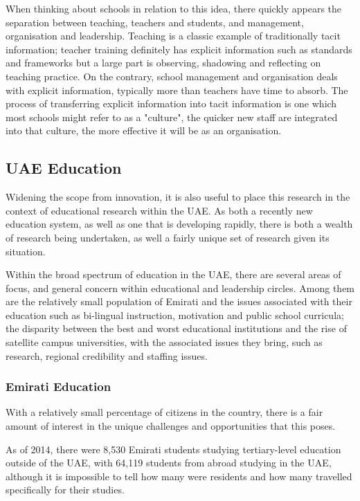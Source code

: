 When thinking about schools in relation to this idea, there quickly appears the separation between teaching, teachers and students, and management, organisation and leadership. Teaching is a classic example of traditionally tacit information; teacher training definitely has explicit information such as standards and frameworks but a large part is observing, shadowing and reflecting on teaching practice. On the contrary, school management and organisation deals with explicit information, typically more than teachers have time to absorb. The process of transferring explicit information into tacit information is one which most schools might refer to as a "culture", the quicker new staff are integrated into that culture, the more effective it will be as an organisation.

\subsection{UAE Education}
Widening the scope from innovation, it is also useful to place this research in the context of educational research within the UAE. As both a recently new education system, as well as one that is developing rapidly, there is both a wealth of research being undertaken, as well a fairly unique set of research given its situation.

Within the broad spectrum of education in the UAE, there are several areas of focus, and general concern within educational and leadership circles. Among them are the relatively small population of Emirati and the issues associated with their education such as bi-lingual instruction, motivation and public school curricula; the disparity between the best and worst educational institutions and the rise of satellite campus universities, with the associated issues they bring, such as research, regional credibility and staffing issues.

\subsubsection{Emirati Education}
With a relatively small percentage of citizens in the country, there is a fair amount of interest in the unique challenges and opportunities that this poses.

As of 2014, there were 8,530 Emirati students studying tertiary-level education outside of the UAE, with 64,119 students from abroad studying in the UAE, although it is impossible to tell how many were residents and how many travelled specifically for their studies.

